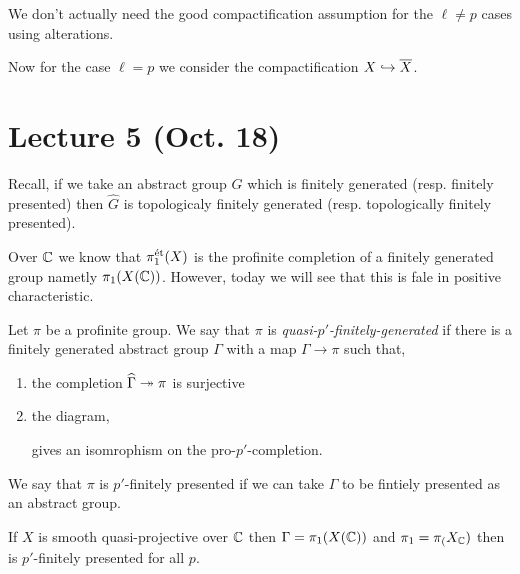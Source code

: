 \documentclass[12pt]{article}
\begin{document}
\begin{rmk}
We don't actually need the good compactification assumption for the $\ell \neq p$ cases using alterations.
\end{rmk}

Now for the case $\ell = p$ we consider the compactification $X \hookrightarrow \overline{X}$. 

\section{Lecture 5 (Oct. 18)}

\begin{rmk}
Recall, if we take an abstract group $G$ which is finitely generated (resp. finitely presented) then $\widehat{G}$ is topologicaly finitely generated (resp. topologically finitely presented). 
\end{rmk}

\begin{prop}
Over $\mathbb{C}$ we know that $\pi_1^{\text{\'{e}t}}(X)$ is the profinite completion of a finitely generated group nametly $\pi_1(X(\mathbb{C}))$. However, today we will see that this is fale in positive characteristic. 
\end{prop}

\begin{defn}
Let $\pi$ be a profinite group. We say that $\pi$ is \textit{quasi-$p'$-finitely-generated} if there is a finitely generated abstract group $\Gamma$ with a map $\Gamma \to \pi$ such that,
\begin{enumerate}
\item the completion $\widehat{\Gamma} \twoheadrightarrow \pi$ is surjective
\item the diagram,
\begin{center}
\end{center}
gives an isomrophism on the pro-$p'$-completion.
\end{enumerate}
We say that $\pi$ is $p'$-finitely presented if we can take $\Gamma$ to be fintiely presented as an abstract group.
\end{defn}

\begin{example}
If $X$ is smooth quasi-projective over $\mathbb{C}$ then $\Gamma = \pi_1(X(\mathbb{C}))$ and $\pi_1 = \pi_(X_{\mathbb{C}})$ then is $p'$-finitely presented for all $p$.
\end{example}
\end{document}
